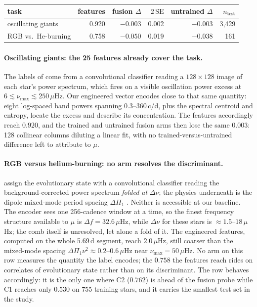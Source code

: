 \documentclass{article}
\begin{document}
\begin{center}
\small
\begin{tabular}{lrrrrr}
\toprule
task & features & fusion $\Delta$ & $2\,\mathrm{SE}$ & untrained $\Delta$ & $n_{\mathrm{test}}$ \\
\midrule
oscillating giants & 0.920 & $-0.003$ & 0.002 & $-0.003$ & 3{,}429 \\
RGB vs.\ He-burning & 0.758 & $-0.050$ & 0.019 & $-0.038$ & 161 \\
\bottomrule
\end{tabular}
\end{center}

\paragraph{Oscillating giants: the 25 features already cover the task.} The labels of
\citet{hon2021} come from a convolutional classifier reading a $128 \times 128$ image of each star's
power spectrum, which fires on a visible oscillation power excess at
$6 \lesssim \nu_{\max} \lesssim 250\,\mu$Hz. Our engineered vector encodes close to that same
quantity: eight log-spaced band powers spanning 0.3--360\,c/d, plus the spectral centroid and
entropy, locate the excess and describe its concentration. The features accordingly reach $0.920$,
and the trained and untrained fusion arms then lose the same $0.003$: 128 collinear columns
diluting a linear fit, with no trained-versus-untrained difference left to attribute to $\mu$.

\paragraph{RGB versus helium-burning: no arm resolves the discriminant.} \citet{sreenivas2026} assign
the evolutionary state with a convolutional classifier reading the background-corrected power spectrum
\emph{folded at} $\Delta\nu$; the physics underneath is the dipole mixed-mode period spacing
$\Delta\Pi_{1}$ \citep{bedding2011}. Neither is accessible at our baseline. The encoder sees one
256-cadence window at a time, so the finest frequency structure available to $\mu$ is
$\Delta f = 32.6\,\mu$Hz, while $\Delta\nu$ for these stars is $\approx 1.5$--$18\,\mu$Hz; the comb
itself is unresolved, let alone a fold of it. The engineered features, computed on the whole 5.69\,d
segment, reach $2.0\,\mu$Hz, still coarser than the mixed-mode spacing
$\Delta\Pi_{1}\nu^{2} \approx 0.2$--$0.6\,\mu$Hz near $\nu_{\max} = 50\,\mu$Hz. No arm on this row
measures the quantity the label encodes; the $0.758$ the features reach rides on correlates of
evolutionary state rather than on its discriminant. The row behaves accordingly: it is the only one
where C2 ($0.762$) is ahead of the fusion probe while C1 reaches only $0.530$ on 755 training stars,
and it carries the smallest test set in the study.
\end{document}
